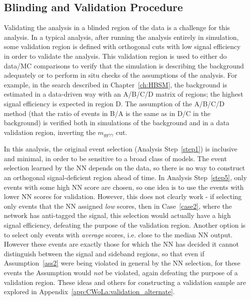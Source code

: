 \FloatBarrier
\subsection{Blinding and Validation Procedure}
\label{sec:CWoLa:blinding}
Validating the analysis in a blinded region of the data is a challenge for this analysis.
In a typical analysis, after running the analysis entirely in simulation, some validation region is defined with orthogonal cuts with low signal efficiency in order to validate the analysis.
This validation region is used to either do data/MC comparisons to verify that the simulation is describing the background adequately or to perform in situ checks of the assumptions of the analysis.
For example, in the search described in Chapter~\ref{ch:HBSM}, the background is estimated in a data-driven way with an A/B/C/D matrix of regions; the highest signal efficiency is expected in region D.
The assumption of the A/B/C/D method (that the ratio of events in B/A is the same as in D/C in the background) is verified both in simulations of the background and in a data validation region, inverting the $m_{gg\gamma\gamma}$ cut.

In this analysis, the original event selection (Analysis Step~\ref{step1}) is inclusive and minimal, in order to be sensitive to a broad class of models.
The event selection learned by the NN depends on the data, so there is no way to construct an orthogonal signal-deficient region ahead of time.
In Analysis Step~\ref{step5}, only events with some high NN score are chosen, so one idea is to use the events with lower NN scores for validation.
However, this does not clearly work - if selecting only events that the NN assigned \textit{low} scores, then in Case~\ref{case2}, where the network has anti-tagged the signal, this selection would actually have a high signal efficiency, defeating the purpose of the validation region.
Another option is to select only events with \textit{average} scores, i.e. close to the median NN output.
However these events are exactly those for which the NN has decided it cannot distinguish between the signal and sideband regions, so that even if Assumption~\ref{ass2} were being violated in general by the NN selection, for these events the Assumption would \textit{not} be violated, again defeating the purpose of a validation region.
These ideas and others for constructing a validation sample are explored in Appendix~\ref{app:CWoLa:validation_alternate}.

